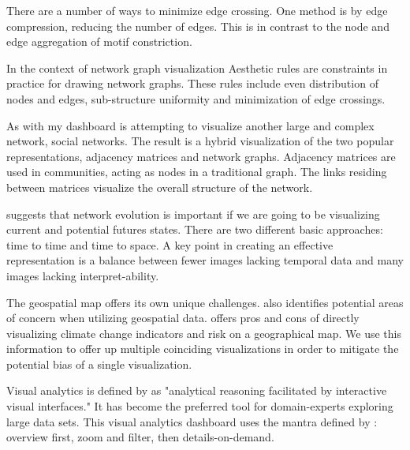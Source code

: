 There are a number of ways to minimize edge crossing. One method is by edge compression, reducing the number of edges.   This is in contrast to the node and edge aggregation of motif constriction. 




In the context of network graph visualization  Aesthetic rules are constraints in practice for drawing network graphs. These rules include even distribution of nodes and edges, sub-structure uniformity and minimization of edge crossings.








As with my dashboard \cite{henry2007nodetrix} is attempting to visualize another large and complex network, social networks. The result is a hybrid visualization of the two popular representations, adjacency matrices and network graphs. Adjacency matrices are used in communities, acting as nodes in a traditional graph. The links residing between matrices visualize the overall structure of the network.


\cite{van2016reducing} suggests that network evolution is important if we are going to be visualizing current and potential futures states. There are two different basic approaches: time to time and time to space. A key point in creating an effective representation is a balance between fewer images lacking temporal data and many images lacking interpret-ability.\par

The geospatial map offers its own unique challenges. \cite{andrienko2011challenging} also identifies potential areas of concern when utilizing geospatial data.
\cite{preston2011putting} offers pros and cons of directly visualizing climate change indicators and risk on a geographical map. We use this information to offer up multiple coinciding visualizations in order to mitigate the potential bias of a single visualization.







Visual analytics is defined by \cite{cook2005illuminating} as "analytical reasoning facilitated by interactive visual interfaces." It has become the preferred tool for domain-experts exploring large data sets.
This visual analytics dashboard uses the mantra defined by \cite{shneiderman1996eyes}: overview first, zoom and filter, then details-on-demand.

